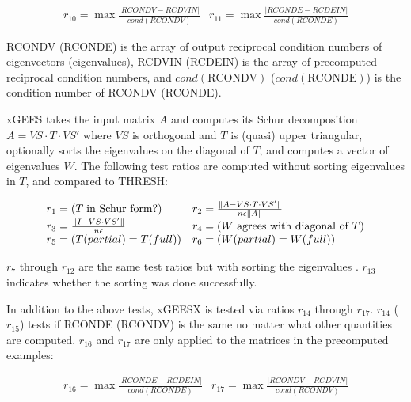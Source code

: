\begin{displaymath}
\begin{array}{ll}
r_{10} = \max \frac{|RCONDV - RCDVIN|}{cond(RCONDV)} & 
r_{11} = \max \frac{|RCONDE - RCDEIN|}{cond(RCONDE)}
\end{array}
\end{displaymath}

RCONDV (RCONDE) is the array of output reciprocal condition numbers
of
eigenvectors (eigenvalues), RCDVIN (RCDEIN) is the array of
precomputed
reciprocal condition numbers, and $cond(\mbox{RCONDV})$ ($cond(\mbox{RCONDE})$) is the
condition number of RCONDV (RCONDE).

xGEES takes the input matrix $A$ and computes its Schur decomposition
$A=VS \cdot T \cdot VS'$ where $VS$ is orthogonal and $T$ is (quasi)
upper triangular, optionally sorts the eigenvalues on the diagonal of
$T$,
and computes a vector of eigenvalues $W$. The following
test ratios are computed without sorting eigenvalues in $T$, and
compared to THRESH:

\begin{displaymath}
\begin{array}{ll}
r_1 = ( T \; {\mbox {\rm in Schur form?} } ) &
r_2 = \frac{\|A - VS \cdot T \cdot VS' \|}{n \epsilon \|A\|} \\
r_3 = \frac{\|I - VS \cdot VS' \|}{n \epsilon} &
r_4 = ( W {\mbox { agrees with diagonal of } } T )  \\
r_5 = ( T(partial) = T(full) ) &
r_6 = ( W(partial) = W(full) ) \\
\end{array}
\end{displaymath}

$r_7$ through $r_{12}$ are the same test ratios but with sorting the
eigenvalues
.
$r_{13}$ indicates whether the sorting was done successfully.

In addition to the above tests, xGEESX is tested via ratios $r_{14}$
through
$r_{17}$. $r_{14}$ ($r_{15}$) tests if RCONDE (RCONDV) is the same
no
matter what other quantities are computed.
$r_{16}$ and $r_{17}$ are only applied to the matrices in the
precomputed
examples:

\begin{displaymath}
\begin{array}{ll}
r_{16} = \max \frac{|RCONDE - RCDEIN|}{cond(RCONDE)} &
r_{17} = \max \frac{|RCONDV - RCDVIN|}{cond(RCONDV)}
\end{array}
\end{displaymath}

